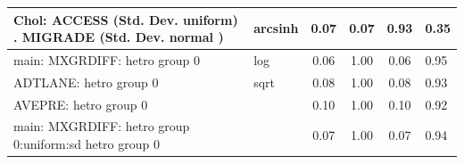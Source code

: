 \begin{table}
\begin{center}
\begin{tabular}{|l|l|c|c|c|l|}
			\hline
			 Chol: ACCESS (Std. Dev. uniform) . MIGRADE (Std. Dev.   normal ) & arcsinh & 0.07 & 0.07 & 0.93 & 0.35 \\
			\hline
			main: MXGRDIFF: hetro group 0 & log & 0.06 & 1.00 & 0.06 & 0.95 \\
			\hline
			ADTLANE: hetro group 0 & sqrt & 0.08 & 1.00 & 0.08 & 0.93 \\
			\hline
			AVEPRE: hetro group 0 &  & 0.10 & 1.00 & 0.10 & 0.92 \\
			\hline
			main: MXGRDIFF: hetro group 0:uniform:sd  hetro group 0 &  & 0.07 & 1.00 & 0.07 & 0.94 \\
			\hline
		\end{tabular}
	\end{center}
\end{table}